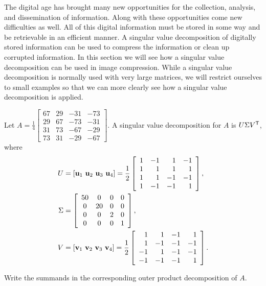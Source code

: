 
The digital age has brought many new opportunities for the collection, analysis, and dissemination of information. Along with these opportunities come new difficulties as well. All of this digital information must be stored in some way and be retrievable in an efficient manner. A singular value decomposition of digitally stored information can be used to compress the information or clean up corrupted information. In this section we will see how a singular value decomposition can be used in image compression. While a singular value decomposition is normally used with very large matrices, we will restrict ourselves to small examples so that we can more clearly see how a singular value decomposition is applied.

\begin{pa} \label{pa:7_d_1} Let $A = \frac{1}{4}\left[ \begin{array}{ccrr} 67&29&-31&-73 \\ 29&67&-73&-31 \\ 31&73&-67&-29  \\ 73&31&-29&-67 \end{array} \right]$. A singular value decomposition for $A$ is $U \Sigma V^{\mathsf{T}}$, where
\begin{align*}
U &= [\mathbf{u}_1 \ \mathbf{u}_2 \ \mathbf{u}_3 \ \mathbf{u}_4] = \frac{1}{2} \left[ \begin{array}{crrr} 1&-1&1&-1\\1&1&1&1\\1&1&-1&-1\\1&-1&-1&1 \end{array} \right], \\
 \Sigma &=  \left[ \begin{array}{cccc} 50&0&0&0\\0&20&0&0\\0&0&2&0\\0&0&0&1 \end{array} \right], \\
 V &= [\mathbf{v}_1 \ \mathbf{v}_2 \ \mathbf{v}_3 \ \mathbf{v}_4] = \frac{1}{2} \left[ \begin{array}{rrrr} 1&1&-1&1\\1&-1&-1&-1\\-1&1&-1&-1\\-1&-1&-1&1 \end{array} \right].
 \end{align*}
	\be
	\item Write the summands in the corresponding outer product decomposition of $A$.
	

\end{pa}
